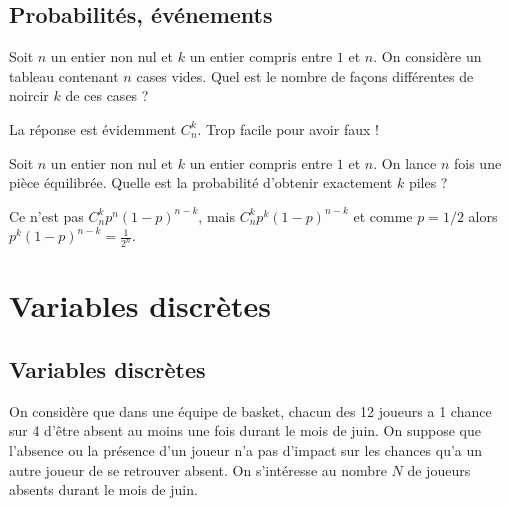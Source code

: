 \subsection{Probabilités, événements}

\begin{question}
Soit $n$ un entier non nul et $k$ un entier compris entre $1$ et $n$. On considère un tableau contenant $n$ cases vides. Quel est le nombre de façons différentes de noircir $k$ de ces cases ?
\begin{answers}
\end{answers}
\begin{explanations}
La réponse est évidemment $C_n^k$. Trop facile pour avoir faux !
\end{explanations}
\end{question}


\begin{question}
Soit $n$ un entier non nul et $k$ un entier compris entre $1$ et $n$. On lance $n$ fois une pièce équilibrée. Quelle est la probabilité d'obtenir exactement $k$ piles ?
\begin{answers}
\end{answers}
\begin{explanations}
Ce n'est pas $C_n^k p^n(1-p)^{n-k}$, mais $C_n^k p^k(1-p)^{n-k}$ et comme $p=1/2$ alors 
$p^k(1-p)^{n-k}= \frac{1}{2^n}$.
\end{explanations}
\end{question}





\section{Variables discrètes}


\subsection{Variables discrètes}


On considère que dans une équipe de basket, chacun des 12 joueurs a 1 chance sur 4 d'être absent au moins une fois durant le mois de juin. On suppose que l'absence ou la présence d'un joueur n'a pas d'impact sur les chances qu'a un autre joueur de se retrouver absent. On s'intéresse au nombre $N$ de joueurs absents durant le mois de juin. 

